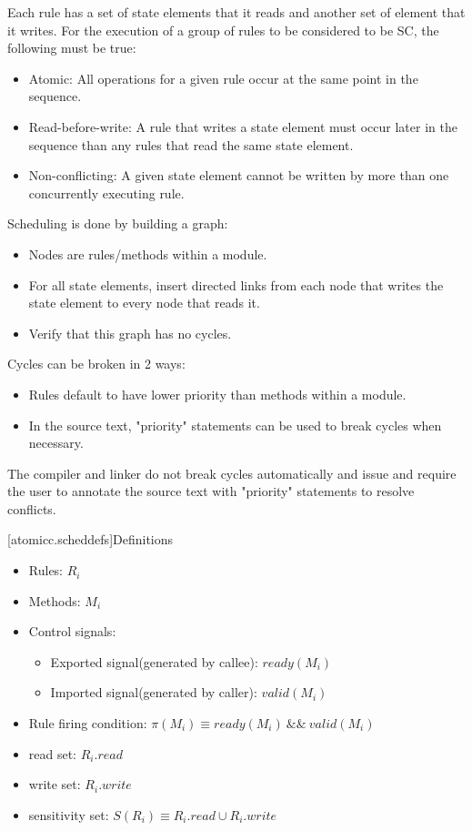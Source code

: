 Each rule has a set of state elements that it reads and another set of element that it writes.
For the execution of a group of rules to be considered to be SC, the following must
be true:

\begin{itemize}
\item Atomic: All operations for a given rule occur at the same point in the sequence.
\item Read-before-write:  A rule that writes a state element must occur later in the sequence
than any rules that read the same state element.
\item Non-conflicting: A given state element cannot be written by more than one concurrently executing rule.
\end{itemize}

Scheduling is done by building a graph:
\begin{itemize}
\item Nodes are rules/methods within a module.
\item For all state elements, insert directed links from each node that writes the state element to every node that reads it.
\item Verify that this graph has no cycles.
\end{itemize}

Cycles can be broken in 2 ways:
\begin{itemize}
\item Rules default to have lower priority than methods within a module.
\item In the source text, "priority" statements can be used to break cycles when necessary.
\end{itemize}

The compiler and linker do not break cycles automatically and issue and require the user to annotate
the source text with "priority" statements to resolve conflicts.

[atomicc.scheddefs]{Definitions}
\begin{itemize}
\item Rules: $R_{i}$
\item Methods: $M_{i}$
\item Control signals:
\begin {itemize}
\item Exported signal(generated by callee):  $ready(M_{i})$
\item Imported signal(generated by caller):  $valid(M_{i})$
\end{itemize}
\item Rule firing condition: $\pi(M_{i}) \equiv ready(M_{i})\ \&\&\ valid(M_{i})$
\item read set: $R_{i}.read$
\item write set: $R_{i}.write$
\item sensitivity set: $S(R_{i}) \equiv R_{i}.read \cup R_{i}.write$
\end{itemize}


